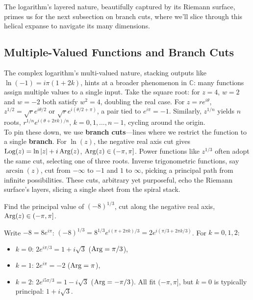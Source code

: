 \noindent The logarithm’s layered nature, beautifully captured by its Riemann surface, primes us for the next subsection on branch cuts, where we’ll slice through this helical expanse to navigate its many dimensions.

\subsection*{Multiple-Valued Functions and Branch Cuts} 

\noindent The complex logarithm’s multi-valued nature, stacking outputs like $\ln(-1) = i\pi (1 + 2k)$, hints at a broader phenomenon in $\mathbb{C}$: many functions assign multiple values to a single input. Take the square root: for $z = 4$, $w = 2$ and $w = -2$ both satisfy $w^2 = 4$, doubling the real case. For $z = r e^{i\theta}$, $z^{1/2} = \sqrt{r} e^{i\theta/2}$ or $\sqrt{r} e^{i(\theta/2 + \pi)}$, a pair tied to $e^{i\pi} = -1$. Similarly, $z^{1/n}$ yields $n$ roots, $r^{1/n} e^{i(\theta + 2\pi k)/n}$, $k = 0, 1, \ldots, n-1$, cycling around the origin. \\

\noindent To pin these down, we use \textbf{branch cuts}—lines where we restrict the function to a single \textbf{branch}. For $\ln(z)$, the negative real axis cut gives $\operatorname{Log}(z) = \ln|z| + i \operatorname{Arg}(z)$, $\operatorname{Arg}(z) \in (-\pi, \pi]$. Power functions like $z^{1/3}$ often adopt the same cut, selecting one of three roots. Inverse trigonometric functions, say $\arcsin(z)$, cut from $-\infty$ to $-1$ and $1$ to $\infty$, picking a principal path from infinite possibilities. These cuts, arbitrary yet purposeful, echo the Riemann surface’s layers, slicing a single sheet from the spiral stack. \\

\exampleline
\begin{example}
Find the principal value of $(-8)^{1/3}$, cut along the negative real axis, $\operatorname{Arg}(z) \in (-\pi, \pi]$.

\begin{solution}
Write $-8 = 8 e^{i\pi}$: $(-8)^{1/3} = 8^{1/3} e^{i(\pi + 2\pi k)/3} = 2 e^{i(\pi/3 + 2\pi k/3)}$. For $k = 0, 1, 2$:
\begin{itemize}
\item $k = 0$: $2 e^{i\pi/3} = 1 + i\sqrt{3}$ ($\operatorname{Arg} = \pi/3$),
\item $k = 1$: $2 e^{i\pi} = -2$ ($\operatorname{Arg} = \pi$),
\item $k = 2$: $2 e^{i 5\pi/3} = 1 - i\sqrt{3}$ ($\operatorname{Arg} = -\pi/3$).
All fit $(-\pi, \pi]$, but $k = 0$ is typically principal: $1 + i\sqrt{3}$.
\end{itemize}
\end{solution}
\end{example}
\exampleline

